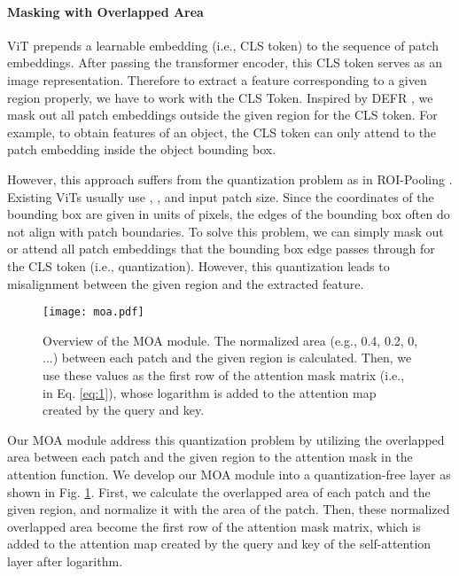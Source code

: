 \documentclass[10pt,twocolumn,letterpaper]{article}
\begin{document}
\paragraph{Masking with Overlapped Area}
ViT prepends a learnable embedding (i.e., CLS token) to the sequence of patch embeddings. After passing the transformer encoder, this CLS token serves as an image representation. Therefore to extract a feature corresponding to a given region properly, we have to work with the CLS Token. Inspired by DEFR \cite{jin2022overlooked}, we mask out all patch embeddings outside the given region for the CLS token. For example, to obtain features of an object, the CLS token can only attend to the patch embedding inside the object bounding box. 

However, this approach suffers from the quantization problem as in ROI-Pooling \cite{he2017mask}. Existing ViTs usually use , , and  input patch size. Since the coordinates of the bounding box are given in units of pixels, the edges of the bounding box often do not align with patch boundaries. To solve this problem, we can simply mask out or attend all patch embeddings that the bounding box edge passes through for the CLS token (i.e., quantization). However, this quantization leads to misalignment between the given region and the extracted feature.

\begin{figure}[t]
\begin{center}

\texttt{[image: moa.pdf]}

\end{center}
\vspace{-5mm}
   \caption{Overview of the MOA module. The normalized area (e.g., 0.4, 0.2, 0, ...) between each patch and the given region is calculated. Then, we use these values as the first row of the attention mask matrix (i.e.,  in Eq. \ref{eq:1}), whose logarithm is added to the attention map created by the query and key.
}
\vspace{-1mm}
\label{fig:moa}
\end{figure} 

Our MOA module address this quantization problem by utilizing the overlapped area between each patch and the given region to the attention mask in the attention function. We develop our MOA module into a quantization-free layer as shown in Fig. \ref{fig:moa}. First, we calculate the overlapped area of each patch and the given region, and normalize it with the area of the patch. Then, these normalized overlapped area become the first row of the attention mask matrix, which is added to the attention map created by the query and key of the self-attention layer after logarithm.
\end{document}
